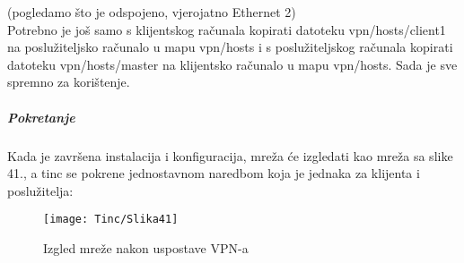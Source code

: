\smallbreak {}
\smallbreak {}
\smallbreak {}
\smallbreak {}
\smallbreak {}  (pogledamo što je odspojeno, vjerojatno Ethernet 2)
\smallbreak {}
\smallbreak {}\\
\FloatBarrier
Potrebno je još samo s klijentskog računala kopirati datoteku vpn/hosts/client1 na poslužiteljsko računalo u mapu vpn/hosts
i s poslužiteljskog računala kopirati datoteku vpn/hosts/master na klijentsko računalo u mapu vpn/hosts. Sada je sve spremno za korištenje.

\subparagraph{Pokretanje}
\hfill \smallbreak
Kada je završena instalacija i konfiguracija, mreža će izgledati kao mreža sa slike 41., a tinc se pokrene jednostavnom naredbom koja je jednaka za klijenta i poslužitelja:
\FloatBarrier
\smallbreak {}
\FloatBarrier
\begin{figure}[h!]
	\centering
     \texttt{[image: Tinc/Slika41]}
     \caption{Izgled mreže nakon uspostave VPN-a}
\end{figure}
\FloatBarrier
